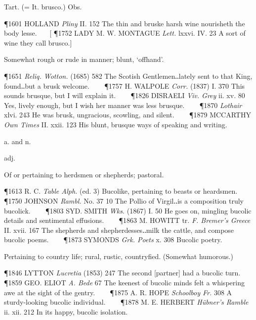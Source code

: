 \begin{description}[wide, labelwidth=!, labelindent=0pt]
\begin{myenumerate}
 Tart. (= It. brusco.) Obs.

\P 1601 HOLLAND  \textit{Pliny} II. 152 The thin and bruske harsh wine nourisheth the body lesse.    [
\P 1752 LADY  M. W. MONTAGUE \textit{Lett.} lxxvi. IV. 23 A sort of wine they call brusco.]

 Somewhat rough or rude in manner; blunt, ‘offhand’.

\P 1651 \textit{Reliq.  Wotton.} (1685) 582 The Scotish Gentlemen‥lately sent to that King, found‥but a brusk welcome.    
\P 1757 H. WALPOLE  \textit{Corr.} (1837) I. 370 This sounds brusque, but I will explain it.    
\P 1826 DISRAELI  \textit{Viv. Grey} ii. xv. 80 Yes, lively enough, but I wish her manner was less brusque.    
\P 1870 \textit{Lothair} xlvi. 243 He was brusk, ungracious, scowling, and silent.    
\P 1879 MCCARTHY  \textit{Own Times} II. xxii. 123 His blunt, brusque ways of speaking and writing.
\end{myenumerate}


 a. and n.

\noindent {}

\vspace{-0.3cm}

\begin{myenumerate}

 adj.

 Of or pertaining to herdsmen or shepherds; pastoral.

\P 1613 R. C. \textit{Table Alph.} (ed. 3) Bucolike, pertaining to beasts or heardsmen.    
\P 1750 JOHNSON  \textit{Rambl.} No. 37 10 The Pollio of Virgil‥is a composition truly bucolick.    
\P 1803 SYD.  SMITH \textit{Wks.} (1867) I. 50 He goes on, mingling bucolic details and sentimental effusions.    
\P 1863 M. HOWITT tr. \textit{F. Bremer's Greece} II. xvii. 167 The shepherds and shepherdesses‥milk the cattle, and compose bucolic poems.    
\P 1873 SYMONDS  \textit{Grk. Poets} x. 308 Bucolic poetry.

 Pertaining to country life; rural, rustic, countryfied. (Somewhat humorous.)

\P 1846 LYTTON  \textit{Lucretia} (1853) 247 The second [partner] had a bucolic turn.    
\P 1859 GEO. ELIOT  \textit{A. Bede} 67 The keenest of bucolic minds felt a whispering awe at the sight of the gentry.    
\P 1875 A. R. HOPE  \textit{Schoolboy Fr.} 308 A sturdy-looking bucolic individual.    
\P 1878 M. E. HERBERT  \textit{Hübner's Ramble} ii. xii. 212 In its happy, bucolic isolation.


\end{myenumerate}
\end{description}
